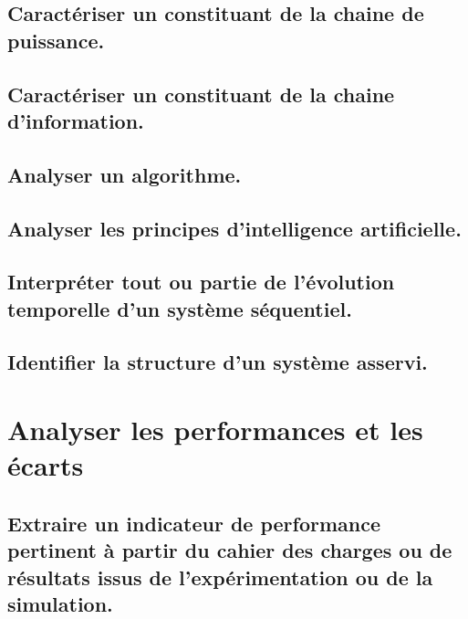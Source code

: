 \documentclass[10pt,fleqn]{book}
\newcommand{\repRel}{../..}
\newcommand{\repStyle}{\repRel/Style}
\newcommand{\td}{fichier_td}
\newcommand{\repExos}{\repRel/ExercicesCompetences}
\newcommand{\repExo}{dossier}
\begin{document}
\subsection{Caractériser un constituant de la chaine de puissance.} 

\subsection{Caractériser un constituant de la chaine d’information.} 

\renewcommand{\repExo}{\repExos/A3_AnalyseFonctionnelleStructurelle/A3_06_ChaineInfo/507_Divers}
\renewcommand{\td}{507_Divers}
\graphicspath{{\repStyle/png/}{\repExo/images/}}


\renewcommand{\repExo}{\repExos/A3_AnalyseFonctionnelleStructurelle/A3_06_ChaineInfo/50_BancBalafre}
\renewcommand{\td}{50_BancBalafre}
\graphicspath{{\repStyle/png/}{\repExo/images/}}


\renewcommand{\repExo}{\repExos/A3_AnalyseFonctionnelleStructurelle/A3_06_ChaineInfo/538_Codeur}
\renewcommand{\td}{538_Codeur}
\graphicspath{{\repStyle/png/}{\repExo/images/}}


\subsection{Analyser un algorithme. } 

\subsection{Analyser les principes d'intelligence artificielle. } 

\subsection{Interpréter tout ou partie de l’évolution temporelle d’un système séquentiel.} 

\subsection{Identifier la structure d'un système asservi.} 

\section{Analyser les performances et les écarts} 

\subsection{Extraire un indicateur de performance pertinent à partir du cahier des charges ou de résultats issus de l'expérimentation ou de la simulation.} 
\end{document}
